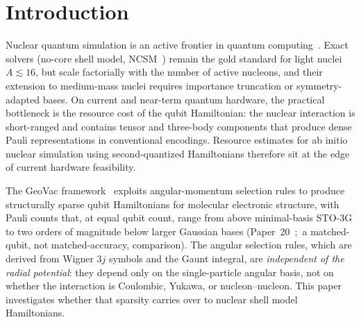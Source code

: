 \documentclass[twocolumn,prc,amsmath,amssymb,superscriptaddress]{revtex4-2}
\begin{document}
\begin{abstract}
Hamiltonians, the GeoVac contribution is therefore the angular machinery
and qubit encoding, not the conformal projection. All nuclear physics
inputs (Minnesota strengths and ranges, used without the potential's
space-exchange mixture;\ spin--orbit strength, $\hbar\omega$)
follow the standard shell-model literature; the quantitative binding
energies at $N_{\mathrm{shells}}=2$ are far from experiment and should
be read as encoding-validation benchmarks, not as a nuclear-structure
calculation.
\end{abstract}

\maketitle

\section{Introduction}

Nuclear quantum simulation is an active frontier in quantum
computing~\cite{Roggero2020,Hagen2014,Romero2022,SarmaStevenson2025,PillaiRamanan2025}. Exact solvers
(no-core shell model, NCSM~\cite{Navratil2000,BarrettNavratilVary2013})
remain the gold standard for light nuclei $A \lesssim 16$, but scale
factorially with the number of active nucleons, and their extension to
medium-mass nuclei requires importance truncation or symmetry-adapted
bases. On current and near-term quantum hardware, the practical
bottleneck is the resource cost of the qubit Hamiltonian: the nuclear
interaction is short-ranged and contains tensor and three-body
components that produce dense Pauli representations in conventional
encodings. Resource estimates for ab initio nuclear simulation using
second-quantized Hamiltonians therefore sit at the edge of current
hardware feasibility.

The GeoVac framework~\cite{Paper14,Paper22} exploits angular-momentum
selection rules to produce structurally sparse qubit Hamiltonians for
molecular electronic structure, with Pauli counts that, at equal qubit
count, range from above minimal-basis STO-3G to two orders of magnitude
below larger Gaussian bases (Paper~20~\cite{Paper20};\ a matched-qubit,
not matched-accuracy, comparison). The
angular selection rules, which are derived from Wigner $3j$ symbols and
the Gaunt integral, are \emph{independent of the radial potential}:
they depend only on the single-particle angular basis, not on whether
the interaction is Coulombic, Yukawa, or nucleon--nucleon. This paper
investigates whether that sparsity carries over to nuclear shell model
Hamiltonians.
\end{document}
